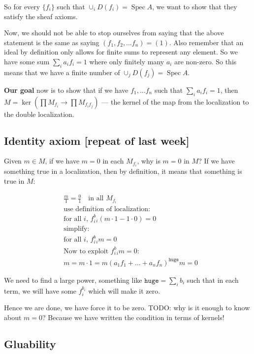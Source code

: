 \documentclass{book}
\newcommand{\spec}{\operatorname{Spec}}
\theoremstyle{definition}
\begin{document}
So for every $\{f_i \}$ such that $\cup_i D(f_i) = \spec A$, we want to show
that they satisfy the sheaf axioms.

Now, we should not be able to stop ourselves from saying that the above
statement is the same as saying $(f_1, f_2, \dots f_n) = (1)$. Also remember
that an ideal by definition only allows for finite sums to represent
any element. So we have some sum $\sum_i a_i f_i = 1$ where only finitely many
$a_i$ are non-zero. So this means that we have a finite number of $\cup_j D(f_j) = \spec A$.

\textbf{Our goal} now is to show that if we have $f_1, \dots f_n$ such that $\sum_i a_i f_i = 1$,
then $M = \ker (\prod M_{f_i} \rightarrow \prod M_{f_i f_j})$ --- the kernel
of the map from the localization to the double localization.

\subsection{Identity axiom [repeat of last week]}
Given $m \in M$, if we have $m = 0$ in each $M_{f_i}$, why is $m = 0$ in $M$?
If we have something true in a localization, then by definition, it means
that something is true in $M$:

\begin{align*}
&\frac{m}{1} = \frac{0}{1} \quad \text{in all $M_{f_i}$} \\
&\text{use definition of localization:} \\
& \text{for all $i$, } f_i^b_i (m\cdot 1 - 1\cdot 0)  = 0  \\
&\text{simplify:} \\
& \text{for all $i$, } f_i^b_i m = 0 \\
& \text{Now to exploit $f_i^b_i m = 0$:} \\
& m = m \cdot 1 = m (a_1 f_1 + \dots + a_n f_n)^{\texttt{huge}} m = 0
\end{align*}

We need to find a large power, something like $\texttt{huge} = \sum_i b_i$
such that in each term, we will have some $f_i^{b_i}$ which will make it zero.

Hence we are done, we have force it to be zero.
TODO: why is it enough to know about $m = 0$? Because we have written the condition
in terms of kernels!


\subsection{Gluability}
\end{document}
